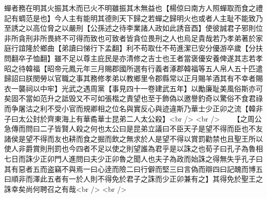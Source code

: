 蟬者務在明其火振其木而已火不明雖振其木無益也【楊倞曰南方人照蟬取而食之禮記有蜩范是也】今人主有能明其德則天下歸之若蟬之歸明火也或者人主耻不能致乃至誘之以高位脅之以嚴刑【公孫述之待李業諸人政如此誘音酉】使彼誠君子邪則位非所貪刑非所畏終不可得而致也可致者皆貪位畏刑之人也烏足貴哉若乃孝弟著於家庭行誼隆於鄉曲【弟讀曰悌行下孟翻】利不苟取仕不苟進潔已安分優游卒歲【分扶問翻卒子恤翻】雖不足以尊主庇民是亦清修之吉士也王者當褒優安養俾遂其志若孝昭之待韓福【昭帝元鳳元年三月賜郡國所選有行義者涿郡韓福等五人帛人五十匹遣歸詔曰朕閔勞以官職之事其務修孝弟以教鄉里令郡縣常以正月賜羊酒其有不幸者賜衣一襲祠以中牢】光武之遇周黨【事見四十一卷建武五年】以勵廉耻美風俗斯亦可矣固不當如范升之詆毁又不可如張楷之責望也至于飾偽以邀譽釣奇以驚俗不食君祿而争屠沽之利不受小官而規卿相之位名與實反心與迹違斯乃華士少正卯之流【韓非子曰太公封於齊東海上有華矞華士昆弟二人太公殺】<br />
<br />
　　【之周公急傳而問曰二子皆賢人殺之何也太公曰是昆弟立議曰不臣天子是望不得而臣也不友諸侯是望不得而友也耕而食之掘而飲之無求於人是望不得以賞罰勸禁也且聖王所以使人非爵賞則刑罰也今四者不足以使之則望誰為君乎是以誅之也荀子曰孔子為魯相七日而誅少正卯門人進問曰夫少正卯魯之聞人也夫子為政而始誅之得無失乎孔子曰其有惡者五而盗竊不與焉一曰心逹而險二曰行僻而堅三曰言偽而辯四曰記醜而博五曰順非而澤此五者有一於人則不得免於君子之誅而少正卯兼有之】其得免於聖王之誅幸矣尚何聘召之有哉<br />
<br />
